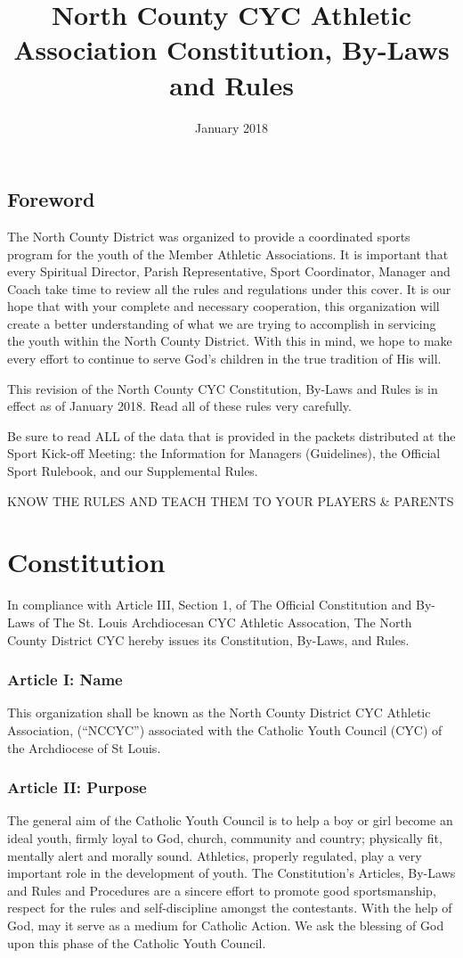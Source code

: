 \documentclass[10pt,oneside,draft]{memoir}
\title{North County CYC Athletic Association Constitution, By-Laws and Rules}
\date{January 2018}
\author{}
\begin{document}
\maketitle
\newpage
\frontmatter
\tableofcontents
\newpage

\chapter{Foreword}
The North County District was organized to provide a coordinated sports program for the youth of the Member Athletic Associations.  It is important that every Spiritual Director, Parish Representative, Sport Coordinator, Manager and Coach take time to review all the rules and regulations under this cover.  It is our hope that with your complete and necessary cooperation, this organization will create a better understanding of what we are trying to accomplish in servicing the youth within the North County District.  With this in mind, we hope to make every effort to continue to serve God's children in the true tradition of His will.

This revision of the North County CYC Constitution, By-Laws and Rules is in effect as of January 2018.  
Read all of these rules very carefully.  

Be sure to read ALL of the data that is provided in the packets distributed at the Sport Kick-off Meeting:  the Information for Managers (Guidelines), the Official Sport Rulebook, and our Supplemental Rules.

KNOW THE RULES AND TEACH THEM TO YOUR PLAYERS \& PARENTS
\newpage
\mainmatter
\part{Constitution}
In compliance with Article III, Section 1, of The Official Constitution and By-Laws of The St. Louis Archdiocesan CYC Athletic Assocation, The North County District CYC hereby issues its Constitution, By-Laws, and Rules.

\section{Article I: Name}
This organization shall be known as the North County District CYC Athletic Association, (“NCCYC”) associated with the Catholic Youth Council (CYC) of the Archdiocese of St Louis.

\section{Article II: Purpose}
The general aim of the Catholic Youth Council is to help a boy or girl become an ideal youth, firmly loyal to God, church, community and country; physically fit, mentally alert and morally sound.  Athletics, properly regulated, play a very important role in the development of youth.  The Constitution’s Articles, By-Laws and Rules and Procedures are a sincere effort to promote good sportsmanship, respect for the rules and self-discipline amongst the contestants.  With the help of God, may it serve as a medium for Catholic Action.  We ask the blessing of God upon this phase of the Catholic Youth Council.
\end{document}
